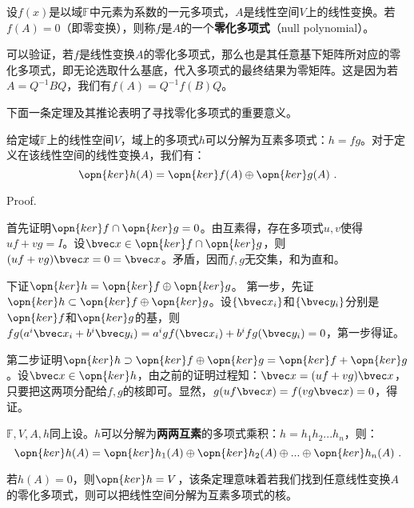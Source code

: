 

\begin{issues}
\issueDraft
\end{issues}



\begin{definition}{}
设$f(x)$是以域$\mathbb F$中元素为系数的一元多项式，$A$是线性空间$V$上的线性变换。若$f(A)=0$（即零变换），则称$f$是$A$的一个\textbf{零化多项式}（null polynomial）。
\end{definition}
可以验证，若$f$是线性变换$A$的零化多项式，那么也是其任意基下矩阵所对应的零化多项式，即无论选取什么基底，代入多项式的最终结果为零矩阵。这是因为若$A=Q^{-1}BQ$，我们有$f(A)=Q^{-1}f(B)Q$。


下面一条定理及其推论表明了寻找零化多项式的重要意义。
\begin{theorem}{}
给定域$\mathbb F$上的线性空间$V$，域上的多项式$h$可以分解为互素多项式：$h=fg$。对于定义在该线性空间的线性变换$A$，我们有：
\begin{equation}
\opn{ker}h(A)=\opn{ker}f(A)\oplus\opn{ker}g(A)~.
\end{equation}
\end{theorem}
Proof.

首先证明$\opn{ker}f\cap \opn{ker}g=0$。由互素得，存在多项式$u,v$使得$uf+vg=I$。设$\bvec x\in \opn{ker}f\cap \opn{ker}g$，则$(uf+vg)\bvec x=0=\bvec x$。矛盾，因而$f,g$无交集，和为直和。

下证$\opn{ker}h=\opn{ker}f\oplus\opn{ker}g$。
第一步，先证$\opn{ker}h\subset\opn{ker}f\oplus\opn{ker}g$。设$\{\bvec x_i\}$和$\{\bvec y_i\}$分别是$\opn{ker}f$和$\opn{ker}g$的基，则$fg(a^i\bvec x_i+b^i \bvec y_i)=a^igf(\bvec x_i)+b^ifg(\bvec y_i)=0$，第一步得证。

第二步证明$\opn{ker}h\supset\opn{ker}f\oplus\opn{ker}g=\opn{ker}f+\opn{ker}g$。设$\bvec x\in \opn{ker}h$，由之前的证明过程知：$\bvec x=(uf+vg)\bvec x$，只要把这两项分配给$f,g$的核即可。显然，$g(uf\bvec x)=f(vg\bvec x) =0$，得证。

\begin{corollary}{}\label{cor_nullpl_1}
$\mathbb F,V,A,h$同上设。$h$可以分解为\textbf{两两互素}的多项式乘积：$h=h_1h_2...h_n$，则：
\begin{equation}
\opn{ker}h(A)=\opn{ker}h_1(A)\oplus\opn{ker}h_2(A)\oplus...\oplus\opn{ker}h_n(A)~.
\end{equation}
\end{corollary}

若$h(A)=0$，则$\opn{ker} h=V$，该条定理意味着若我们找到任意线性变换$A$的零化多项式，则可以把线性空间分解为互素多项式的核。

